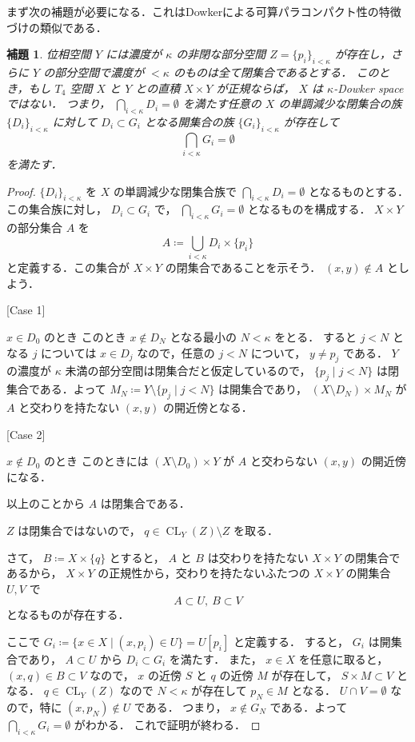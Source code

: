 \documentclass[leqno, 12pt]{ltjsarticle}
\newtheorem{lem}[thm]{補題}
\DeclareMathOperator{\cl}{CL}
\begin{document}
まず次の補題が必要になる．これはDowkerによる可算パラコンパクト性の特徴づけの類似である．
\begin{lem}
位相空間
$Y$
には濃度が
$\kappa$
の非閉な部分空間
$Z=\{p_{i}\}_{i<\kappa}$
が存在し，さらに
$Y$
の部分空間で濃度が
$<\kappa$
のものは全て閉集合であるとする．
このとき，もし
$T_{4}$
空間
$X$
と
$Y$
との直積
$X\times Y$
が正規ならば，
$X$
は
$\kappa$-Dowker space
ではない．
つまり，
$\bigcap_{i<\kappa}D_{i}=\emptyset$
を満たす任意の
$X$
の単調減少な閉集合の族
$\{D_{i}\}_{i<\kappa}$
に対して
$D_{i}\subset G_{i}$
となる開集合の族
$\{G_{i}\}_{i<\kappa}$
が存在して
\[
\bigcap_{i<\kappa}G_{i}=\emptyset
\]を満たす．
\end{lem}
\begin{proof}

$\{D_{i}\}_{i<\kappa}$
を
$X$
の単調減少な閉集合族で
$\bigcap_{i<\kappa}D_{i}=\emptyset$
となるものとする．この集合族に対し，
$D_{i}\subset G_{i}$
で，
$\bigcap_{i<\kappa}G_{i}=\emptyset$
となるものを構成する．
$X\times Y$
の部分集合
$A$
を
\[
A\coloneqq\bigcup_{i<\kappa}D_{i}\times \{p_{i}\}
\]
と定義する．この集合が
$X\times Y$
の閉集合であることを示そう．
$(x,y)\notin A$
としよう．

[Case 1]

$x\in D_{0}$
のとき
このとき
$x\notin D_{N}$
となる最小の
$N<\kappa$
をとる．
すると
$j<N$
となる
$j$
については
$x\in D_{j}$
なので，任意の
$j<N$
について，
$y\neq p_{j}$
である．
$Y$
の濃度が
$\kappa$
未満の部分空間は閉集合だと仮定しているので，
$\{p_{j} \mid j<N\}$
は閉集合である．よって
$M_{N}\coloneqq Y\setminus \{p_{j} \mid j<N\}$
は開集合であり，
$(X\setminus D_{N})\times M_{N}$
が
$A$
と交わりを持たない
$(x,y)$
の開近傍となる．

[Case 2]

$x\notin D_{0}$
のとき
このときには
$(X\setminus D_{0})\times Y$
が
$A$
と交わらない
$(x,y)$
の開近傍になる．

以上のことから
$A$
は閉集合である．

$Z$
は閉集合ではないので，
$q\in \cl_{Y}(Z)\setminus Z$
を取る．

さて，
$B\coloneqq X\times \{q\}$
とすると，
$A$
と
$B$
は交わりを持たない
$X\times Y$
の閉集合であるから，
$X\times Y$
の正規性から，交わりを持たないふたつの
$X\times Y$
の開集合
$U,V$
で
\[
A\subset U,\ B\subset V
\]
となるものが存在する．

ここで
$G_{i}\coloneqq\{x\in X \mid (x, p_{i})\in U\}=U[p_{i}]$
と定義する．
すると，
$G_{i}$
は開集合であり，
$A\subset U$
から
$D_{i}\subset G_{i}$
を満たす．
また，
$x\in X$
を任意に取ると，
$(x, q)\in B\subset V$
なので，
$x$
の近傍
$S$
と
$q$
の近傍
$M$
が存在して，
$S\times M\subset V$
となる．
$q\in \cl_{Y}(Z)$
なので
$N<\kappa$
が存在して
$p_{N}\in M$
となる．
$U\cap V=\emptyset$
なので，特に
$(x, p_{N})\notin U$
である．
つまり，
$x\notin G_{N}$
である．よって
$\bigcap_{i<\kappa}G_{i}=\emptyset$
がわかる．
これで証明が終わる．
\end{proof}
\end{document}
